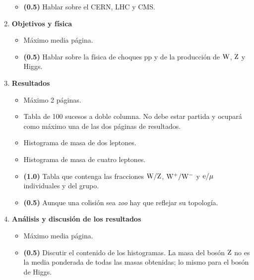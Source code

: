 \documentclass[11pt]{articulo}
\begin{document}
\begin{enumerate}
\begin{itemize}
\item {\bf (0.5)} Hablar sobre el CERN, LHC y CMS.

\end{itemize}

\item {\bf Objetivos y f\'isica}

\begin{itemize}

\item M\'aximo media p\'agina.

\item {\bf (0.5)} Hablar sobre la f\'isica de choques pp y de la producci\'on de ${\rm W}$, ${\rm Z}$ y Higgs.

\end{itemize}

\item {\bf Resultados}

\begin{itemize}

\item M\'aximo 2 p\'aginas.

\item Tabla de 100 sucesos a doble columna. No debe estar partida y ocupar\'a como m\'aximo una de las dos p\'aginas de resultados.

\item Histograma de masa de dos leptones.

\item Histograma de masa de cuatro leptones.

\item {\bf (1.0)} Tabla que contenga las fracciones ${\rm W/Z}$, ${\rm W^+/W^-}$ y ${\rm e/\mu}$ individuales y del grupo.

\item {\bf (0.5)} Aunque una colisi\'on sea {\it zoo} hay que reflejar su topolog\'ia.

\end{itemize}

\newpage

\item {\bf An\'alisis y discusi\'on de los resultados}

\begin{itemize}

\item M\'aximo media p\'agina.

\item {\bf (0.5)} Discutir el contenido de los histogramas. La masa del bos\'on ${\rm Z}$ no es la media ponderada de todas las masas obtenidas; lo mismo para el bos\'on de Higgs.


\end{itemize}
\end{enumerate}
\end{document}
